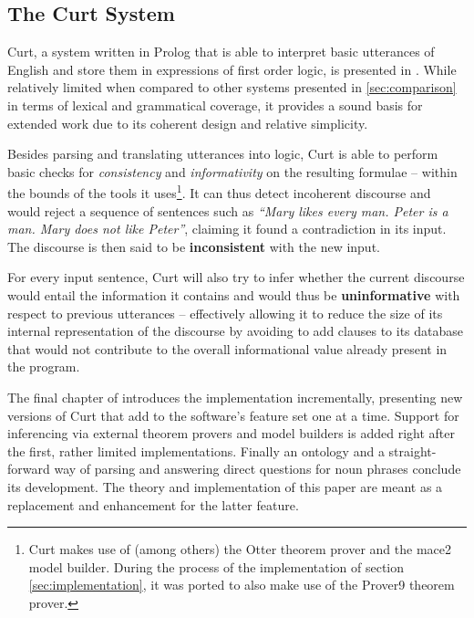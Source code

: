 \documentclass[notitlepage,twoside,a4paper]{scrreprt}
\newcommand{\term}[1]{\textsf{\textbf{#1}}} %
\newcommand{\pn}{\textsf} %
\newcommand{\curt}{\pn{Curt}}
\newcommand{\prol}{\pn{Prolog}}
\theoremstyle{remark}
\theoremstyle{remark}
\theoremstyle{definition}
\theoremstyle{definition}
\begin{document}
\subsection{The Curt System} \label{sec:curt}

\curt, a system written in \prol{} that is able to interpret basic utterances
of English and store them in expressions of first order logic, is
presented in \cite[chapter 6]{blackburnbos:cl1}. While relatively limited when
compared to other systems presented in \ref{sec:comparison} in terms of lexical
and grammatical coverage, it provides a sound basis for extended work due to
its coherent design and relative simplicity.

Besides parsing and translating utterances into logic, \curt{} is able to perform
basic checks for \emph{consistency} and \emph{informativity} on the resulting
formulae -- within the bounds of the tools it uses\footnote{\curt{} makes use
of (among others) the \pn{Otter} theorem prover and the \pn{mace2} model
builder. During the process of the implementation of section
\ref{sec:implementation}, it was ported to also make use of the \pn{Prover9}
theorem prover.}.
It can thus detect incoherent discourse and would reject a sequence of
sentences such as \emph{``Mary likes every man. Peter is a man. Mary does not
like Peter''}, claiming it found a contradiction in its input. The discourse is
then said to be \term{inconsistent} with the new input.

For every input
sentence, \curt{} will also try to infer whether the current discourse would
entail the information it contains and would thus be \term{uninformative} with
respect to previous utterances – effectively allowing it to
reduce the size of its internal representation of the discourse by avoiding to
add clauses to its database that would not contribute to the overall informational value
already present in the program.

The final chapter of \cite{blackburnbos:cl1} introduces the implementation
incrementally, presenting new versions of \curt{} that add to the software's
feature set one at a time. Support for inferencing via external theorem provers
and model builders is added right after the first, rather limited implementations.
Finally an ontology and a straight-forward way of parsing and answering direct
questions for noun phrases conclude its development. The theory and
implementation of this paper are meant as a replacement and enhancement for the
latter feature. 
\end{document}
